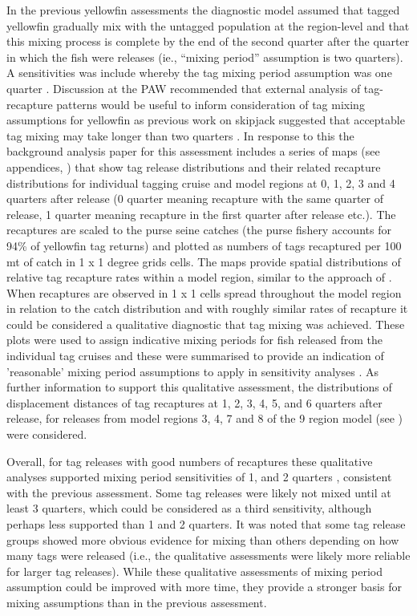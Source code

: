 In the previous yellowfin assessments the diagnostic model assumed that tagged yellowfin gradually mix with the untagged population at the region-level and that this mixing process is complete by the end of the second quarter after the quarter in which the fish were releases (ie., ``mixing period'' assumption is two quarters). A sensitivities was include whereby the tag mixing period assumption was one quarter \citep{vincent_stock_2020}. Discussion at the PAW \citep{hamer_report_2023} recommended that external analysis of tag-recapture patterns would be useful to inform consideration of tag mixing assumptions for yellowfin as previous work on skipjack suggested that acceptable tag mixing may take longer than two quarters \citep{kolody_evaluation_2014}. In response to this the background analysis paper for this assessment includes a series of maps (see appendices, \citet{teears_cpue_2023}) that show tag release distributions and their related recapture distributions for individual tagging cruise and model regions at 0, 1, 2, 3 and 4 quarters after release (0 quarter meaning recapture with the same quarter of release, 1 quarter meaning recapture in the first quarter after release etc.). The recaptures are scaled to the purse seine catches (the purse fishery accounts for 94\% of yellowfin tag returns) and plotted as numbers of tags recaptured per 100 mt of catch in 1 x 1 degree grids cells. The maps provide spatial distributions of relative tag recapture rates within a model region, similar to the approach of \citet{langley_determining_2012}. When recaptures are observed in 1 x 1 cells spread throughout the model region in relation to the catch distribution and with roughly similar rates of recapture it could be considered a qualitative diagnostic that tag mixing was achieved. These plots were used to assign indicative mixing periods for fish released from the individual tag cruises and these were summarised to provide an indication of 'reasonable' mixing period assumptions to apply in sensitivity analyses \citep{teears_cpue_2023}. As further information to support this qualitative assessment, the distributions of displacement distances of tag recaptures at 1, 2, 3, 4, 5, and 6 quarters after release, for releases from model regions 3, 4, 7 and 8 of the 9 region model (see \citet{teears_cpue_2023}) were considered.

Overall, for tag releases with good numbers of recaptures these qualitative analyses supported mixing period sensitivities of 1, and 2 quarters \citep{teears_cpue_2023}, consistent with the previous assessment. Some tag releases were likely not mixed until at least 3 quarters, which could be considered as a third sensitivity, although perhaps less supported than 1 and 2 quarters. It was noted that some tag release groups showed more obvious evidence for mixing than others depending on how many tags were released (i.e., the qualitative assessments were likely more reliable for larger tag releases). While these qualitative assessments of mixing period assumption could  be improved with more time, they provide a stronger basis for mixing assumptions than in the previous assessment.

